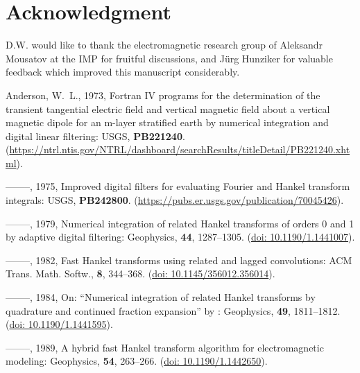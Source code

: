 \documentclass[paper,twocolumn,twoside]{geophysics}
\begin{document}
\section{Acknowledgment}

D.W. would like to thank the electromagnetic research group of Aleksandr
Mousatov at the IMP for fruitful discussions, and Jürg Hunziker for valuable
feedback which improved this manuscript considerably.

\begin{thebibliography}{}
\itemsep0pt

Anderson, W.~L.,  1973, Fortran {IV} programs for the determination of the
  transient tangential electric field and vertical magnetic field about a
  vertical magnetic dipole for an m-layer stratified earth by numerical
  integration and digital linear filtering: USGS, {\bf PB221240}.
\newblock
  (\href{https://ntrl.ntis.gov/NTRL/dashboard/searchResults/titleDetail/PB221240.xhtml}{https://ntrl.ntis.gov\-/NTRL\-/dashboard\-/searchResults\-/titleDetail\-/PB221240.xhtml}).

--------, 1975, Improved digital filters for evaluating {F}ourier and {H}ankel
  transform integrals: USGS, {\bf PB242800}.
\newblock
  (\href{https://pubs.er.usgs.gov/publication/70045426}{https://pubs.er.usgs.gov/publication/70045426}).

--------, 1979, Numerical integration of related {H}ankel transforms of orders
  0 and 1 by adaptive digital filtering: Geophysics, {\bf 44}, 1287--1305.
\newblock (\href{https://doi.org/10.1190/1.1441007}{doi: 10.1190/1.1441007}).

--------, 1982, Fast {H}ankel transforms using related and lagged convolutions:
  ACM Trans. Math. Softw., {\bf 8}, 344--368.
\newblock (\href{https://doi.org/10.1145/356012.356014}{doi:
  10.1145/356012.356014}).

--------, 1984, {On: “Numerical integration of related Hankel transforms by
  quadrature and continued fraction expansion” by \cite{GEO.83.Chave}}:
  Geophysics, {\bf 49}, 1811--1812.
\newblock (\href{https://doi.org/10.1190/1.1441595}{doi: 10.1190/1.1441595}).

--------, 1989, A hybrid fast {H}ankel transform algorithm for electromagnetic
  modeling: Geophysics, {\bf 54}, 263--266.
\newblock (\href{https://doi.org/10.1190/1.1442650}{doi: 10.1190/1.1442650}).


\end{thebibliography}
\end{document}
